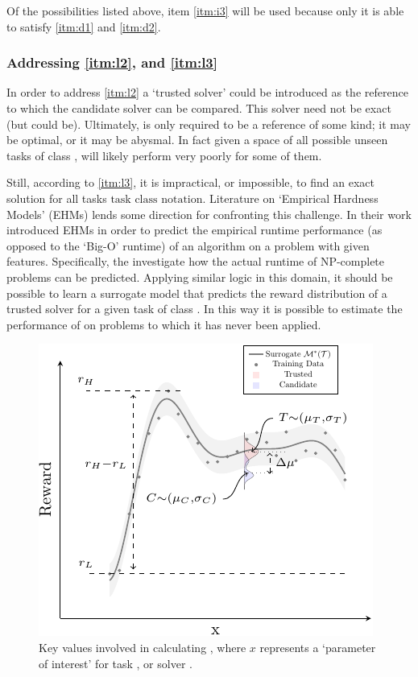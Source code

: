         Of the possibilities listed above, item \ref{itm:i3} will be used because only it is able to satisfy \ref{itm:d1} and \ref{itm:d2}.

    \subsubsection{Addressing \ref{itm:l2}, and \ref{itm:l3}} \label{sec:practicality}
        In order to address \ref{itm:l2} a `trusted solver' \solvestar{} could be introduced as the reference to which the candidate solver \solve{} can be compared. This solver need not be exact (but could be). Ultimately, \solvestar{} is only required to be a reference of some kind; it may be optimal, or it may be abysmal. In fact given a space of all possible unseen tasks of class \taskclass, \solvestar{} will likely perform very poorly for some of them.

        Still, according to \ref{itm:l3}, it is impractical, or impossible, to find an exact solution for all tasks $\text{task class notation}$. Literature on `Empirical Hardness Models' (EHMs) lends some direction for confronting this challenge. In their work \cite{Leyton-Brown2009-yr,Hutter2009-og} introduced EHMs in order to predict the empirical runtime performance (as opposed to the `Big-O' runtime) of an algorithm on a problem with given features. Specifically, the investigate how the actual runtime of NP-complete problems can be predicted. Applying similar logic in this domain, it should be possible to learn a surrogate model \surrogate{} that predicts the reward distribution \rwdstarapprox{} of a trusted solver \solvestar{} for a given task \task{} of class \taskclass. In this way it is possible to estimate the performance of \solvestar{} on problems to which it has never been applied.
        
   \begin{figure}[tb]
        \centering
        \includegraphics[width=0.75\linewidth]{Figures/sq_v2_fig-crop}
        \caption{Key values involved in calculating \xQ, where $x$ represents a `parameter of interest' for task \task, or solver \solve.}
        \label{fig:sq_v2}
    \end{figure}

